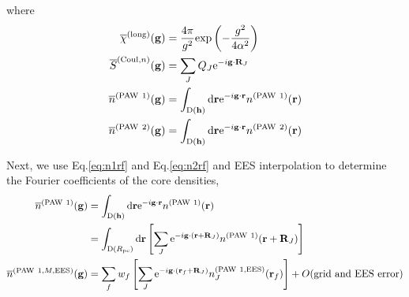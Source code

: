 \documentclass[paper=a4, fontsize=11pt]{article} %
\numberwithin{equation}{section} %
\numberwithin{figure}{section} %
\numberwithin{table}{section} %
\newcommand{\ol}{\overline}
\newcommand{\bh}{{\bf{h}}}
\newcommand{\bg}{{\bf{g}}}
\newcommand{\br}{{\bf{r}}}
\newcommand{\bR}{{\bf{R}}}
\newcommand{\rexp}{{\mathrm{exp}}}
\newcommand{\rEES}{{\mathrm{EES}}}
\newcommand{\re}{{\mathrm{e}}}
\newcommand{\rCo}{{\mathrm{Coul}}}
\newcommand{\rlong}{{\mathrm{long}}}
\newcommand{\rP}{{\mathrm{PAW}}}
\newcommand{\rd}{{\mathrm{d}}}
\newcommand{\rD}{{\mathrm{D}}}
\newcommand{\ibgR}{i\bg\cdot\bR}
\newcommand{\ibgr}{i\bg\cdot\br}
\newcommand{\Rpc}{{R_{\mathrm{pc}}}}
\begin{document}
where
\begin{equation} \label{eq:llocdef}
\begin{split}
\ol \chi^{(\rlong)}(\bg) &= \frac{4\pi}{g^2} \rexp\left(-\frac{g^2}{4\alpha^2}\right) \\
\ol S^{(\rCo,n)}(\bg) &= \sum_J Q_J\re^{-\ibgR_J} \\
\ol n^{(\rP\ 1)}(\bg) &= \int_{\rD(\bh)}  \rd \br \re^{-\ibgr} n^{(\rP\ 1)}(\br) \\
\ol n^{(\rP\ 2)}(\bg) &= \int_{\rD(\bh)}  \rd \br \re^{-\ibgr} n^{(\rP\ 2)}(\br) \\
\end{split}
\end{equation}

Next, we use Eq.\eqref{eq:n1rf} and Eq.\eqref{eq:n2rf} and EES interpolation to determine the Fourier coefficients of the core densities,
\begin{equation}
\begin{split}
\ol n^{(\rP\ 1)}(\bg) 
&= \int_{\rD(\bh)}  \rd \br \re^{-\ibgr} n^{(\rP\ 1)}(\br)\\
&= \int_{\rD(\Rpc)}  \rd \br \left[\sum_J \re^{-i\bg\cdot(\br+\bR_J)} n^{(\rP\ 1)}(\br+\bR_J)\right]\\
\ol n^{(\rP\ 1,M,\rEES)}(\bg) 
&= \sum_f w_f \left[\sum_J \re^{-i\bg\cdot(\br_f+\bR_J)}n_J^{(\rP\ 1,\rEES)}(\br_f) \right] + O(\mathrm{grid\ and\ EES\ error}) \\
\end{split}
\end{equation}
\end{document}
